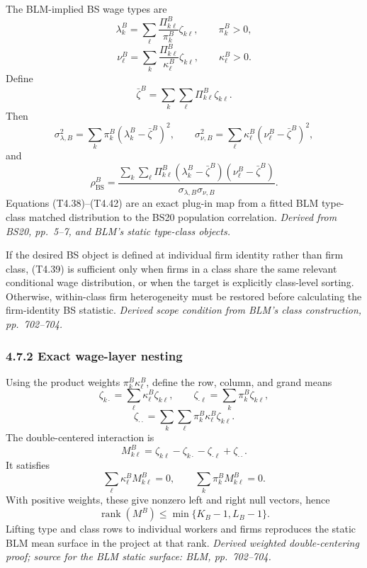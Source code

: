 \documentclass[11pt]{article}
\begin{document}
The BLM-implied BS wage types are
\[
\lambda_k^B
=
\sum_\ell
\frac{\Pi^B_{k\ell}}{\pi_k^B}
\zeta_{k\ell},
\qquad
\pi_k^B>0,
\tag{T4.38}
\]
\[
\nu_\ell^B
=
\sum_k
\frac{\Pi^B_{k\ell}}{\kappa_\ell^B}
\zeta_{k\ell},
\qquad
\kappa_\ell^B>0.
\tag{T4.39}
\]
Define
\[
\bar\zeta^B
=
\sum_k\sum_\ell\Pi^B_{k\ell}\zeta_{k\ell}.
\tag{T4.40}
\]
Then
\[
\sigma_{\lambda,B}^2
=
\sum_k\pi_k^B(\lambda_k^B-\bar\zeta^B)^2,
\qquad
\sigma_{\nu,B}^2
=
\sum_\ell\kappa_\ell^B(\nu_\ell^B-\bar\zeta^B)^2,
\tag{T4.41}
\]
and
\[
\rho_{\mathrm{BS}}^B
=
\frac{
\displaystyle
\sum_k\sum_\ell
\Pi^B_{k\ell}
(\lambda_k^B-\bar\zeta^B)
(\nu_\ell^B-\bar\zeta^B)
}{
\sigma_{\lambda,B}\sigma_{\nu,B}
}.
\tag{T4.42}
\]
Equations (T4.38)--(T4.42) are an exact plug-in map from a fitted BLM
type-class matched distribution to the BS20 population correlation.
\textit{Derived from BS20, pp.\ 5--7, and BLM's static type-class objects.}

If the desired BS object is defined at individual firm identity rather than
firm class, (T4.39) is sufficient only when firms in a class share the same
relevant conditional wage distribution, or when the target is explicitly
class-level sorting.  Otherwise, within-class firm heterogeneity must be
restored before calculating the firm-identity BS statistic.
\textit{Derived scope condition from BLM's class construction,
pp.\ 702--704.}

\subsubsection{4.7.2 Exact wage-layer nesting}

Using the product weights \(\pi_k^B\kappa_\ell^B\), define the row, column, and
grand means
\[
\zeta_{k\cdot}
=
\sum_\ell\kappa_\ell^B\zeta_{k\ell},
\qquad
\zeta_{\cdot\ell}
=
\sum_k\pi_k^B\zeta_{k\ell},
\tag{T4.43}
\]
\[
\zeta_{\cdot\cdot}
=
\sum_k\sum_\ell
\pi_k^B\kappa_\ell^B\zeta_{k\ell}.
\tag{T4.44}
\]
The double-centered interaction is
\[
M^B_{k\ell}
=
\zeta_{k\ell}
-\zeta_{k\cdot}
-\zeta_{\cdot\ell}
+\zeta_{\cdot\cdot}.
\tag{T4.45}
\]
It satisfies
\[
\sum_\ell\kappa_\ell^BM^B_{k\ell}=0,
\qquad
\sum_k\pi_k^BM^B_{k\ell}=0.
\tag{T4.46}
\]
With positive weights, these give nonzero left and right null vectors, hence
\[
\operatorname{rank}(M^B)
\leq
\min\{K_B-1,L_B-1\}.
\tag{T4.47}
\]
Lifting type and class rows to individual workers and firms reproduces the
static BLM mean surface in the project at that rank.
\textit{Derived weighted double-centering proof; source for the BLM static
surface: BLM, pp.\ 702--704.}
\end{document}
